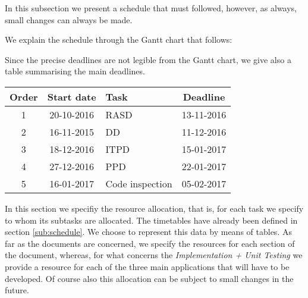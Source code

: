 In this subsection we present a schedule that must followed, however, as always, small changes can always be made.

We explain the schedule through the Gantt chart that follows:

%
%
%
%
%
%
%
%
%
%
%
%
%


Since the precise deadlines are not legible from the Gantt chart, we give also a table summarising the main deadlines.

\begin{center}
\begin{tabular}{ |c|c|l|c| } \hline
	\textbf{Order} & \textbf{Start date} & \textbf{Task} & \textbf{Deadline} \\ \hline
	1 & 20-10-2016 & RASD & 13-11-2016 \\ \hline
	2 & 16-11-2015 & DD & 11-12-2016 \\ \hline
	3 & 18-12-2016 & ITPD & 15-01-2017 \\ \hline
	4 & 27-12-2016 & PPD & 22-01-2017 \\ \hline
	5 & 16-01-2017 & Code inspection  & 05-02-2017 \\ \hline
\end{tabular}
\end{center}


\newpage




In this section we specifiy the resource allocation, that is, for each task we specify to whom its subtasks are allocated. The timetables have already been defined in section \ref{sub:schedule}.
We choose to represent this data by means of tables. As far as the documents are concerned, we specify the resources for each section of the document, whereas, for what concerns the \emph{Implementation + Unit Testing} we provide a resource for each of the three main applications that will have to be developed. Of course also this allocation can be subject to small changes in the future.

